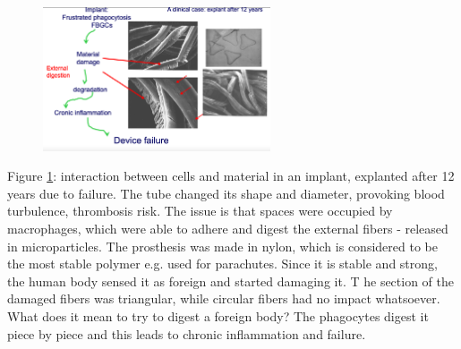 \begin{figure}[ht]
\centering
\includegraphics[width=0.6\textwidth]{failure}
\caption{\label{fig:failure}}
\end{figure}
\noindent
Figure \ref{fig:failure}: interaction between cells and material in an implant, explanted after 12 years due to failure.
The tube changed its shape and diameter, provoking blood turbulence, thrombosis risk.
The issue is that spaces were occupied by macrophages, which were able to adhere and digest the external fibers - released in microparticles.
The prosthesis was made in nylon, which is considered to be the most stable polymer e.g. used for parachutes.
Since it is stable and strong, the human body sensed it as foreign and started damaging it. T
he section of the damaged fibers was triangular, while circular fibers had no impact whatsoever.
What does it mean to try to digest a foreign body? The phagocytes digest it piece by piece and this leads to chronic inflammation and failure.

